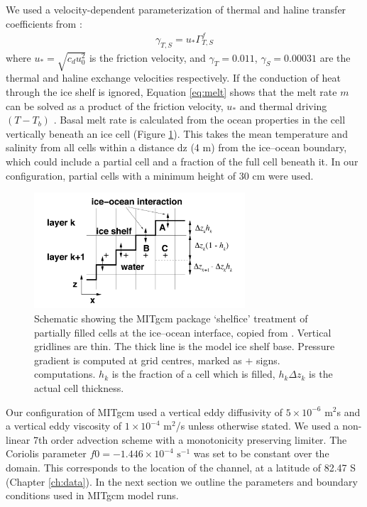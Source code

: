 We used a velocity-dependent parameterization of thermal and haline transfer coefficients from \cite{holland1999modeling}:
\begin{align}
    \gamma_{T,S} = u_* \Gamma^f_{T,S}
\end{align}
where $u_* = \sqrt{c_d u^2_0}$ is the friction velocity, and $\gamma_{T}=0.011$, $\gamma_{S}=0.00031$ are the thermal and haline exchange velocities respectively. 
If the conduction of heat through the ice shelf is ignored, Equation \ref{eq:melt} shows that the melt rate $m$ can be solved as a product of the friction velocity, $u_*$ and thermal driving $(T - T_b)$ \citep{holland2008response}. Basal melt rate is calculated from the ocean properties in the cell vertically beneath an ice cell (Figure \ref{fig:melt_cells}). This takes the mean temperature and salinity from all cells within a distance dz (4 m) from the ice--ocean boundary, which could include a partial cell and a fraction of the full cell beneath it. In our configuration, partial cells with a minimum height of 30 cm were used.
\begin{figure}[!ht]
\centering
\includegraphics[width=0.7\textwidth]{chapters/4/melt_cells.png}
\caption[Melt schematic]{ Schematic showing the MITgcm package
`shelfice' treatment of partially filled cells at the ice--ocean interface, copied from \cite{losch2008modeling}. Vertical gridlines are thin. The thick line is the model ice shelf base.
Pressure gradient is computed at grid centres, marked as $+$ signs. computations. $h_k$ is the fraction of a cell which is filled, $h_k \Delta z_k$ is the actual cell thickness.}
\label{fig:melt_cells}
\end{figure}

Our configuration of MITgcm used a vertical eddy diffusivity of  $5 \times 10^{-6}$ $\mathrm{m}^2$s and a vertical eddy viscosity of $1 \times 10^{-4}$ $\mathrm{m}^2$/s unless otherwise stated. We used a non-linear 7th order advection scheme with a monotonicity preserving limiter.
The Coriolis parameter $f0 = -1.446 \times 10^{-4}$ $\mathrm{s}^{-1}$ was set to be constant over the domain. This corresponds to the location of the channel, at a latitude of 82.47 S (Chapter  \ref{ch:data}). 
In the next section we outline the parameters and boundary conditions used in MITgcm model runs.

